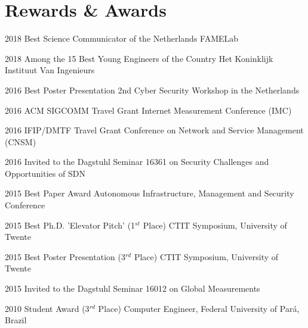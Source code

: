\documentclass[print]{styles/friggeri-cv-mac} %
\begin{document}
\section{Rewards \& Awards}\vspace{-5pt}

\begin{entrylist}
	
\vspace{-0.3cm}
\entry
{2018}
{Best Science Communicator of the Netherlands}
{FAMELab}

\vspace{-0.3cm}
\entry
{2018}
{Among the 15 Best Young Engineers of the Country}
{Het Koninklijk Instituut Van Ingenieurs}	

\vspace{-0.3cm}
\entry
{2016}
{Best Poster Presentation}
{2nd Cyber Security Workshop in the Netherlands}

\vspace{-0.3cm}
\entry
{2016}
{ACM SIGCOMM Travel Grant}
{Internet Measurement Conference (IMC)}

\vspace{-0.3cm}
\entry
{2016}
{IFIP/DMTF Travel Grant}
{Conference on Network and Service Management (CNSM)}

\vspace{-0.3cm}
\entry
{2016}
{Invited to the Dagstuhl Seminar 16361}
{on Security Challenges and Opportunities of SDN}


\vspace{-0.3cm}
\entry
{2015}
{Best Paper Award}
{Autonomous Infrastructure, Management and Security Conference}

\vspace{-0.3cm}
\entry
{2015}
{Best Ph.D. 'Elevator Pitch' (1$^{st}$ Place)}
{CTIT Symposium, University of Twente}

\vspace{-0.3cm}
\entry
{2015}
{Best Poster Presentation (3$^{rd}$ Place)}
{CTIT Symposium, University of Twente}

\vspace{-0.3cm}
\entry
{2015}
{Invited to the Dagstuhl Seminar 16012}
{on Global Measurements}


\vspace{-0.3cm}
\entry
{2010}
{Student Award (3$^{rd}$ Place)}
{Computer Engineer, Federal University of Pará, Brazil}

\end{entrylist}
\end{document}
